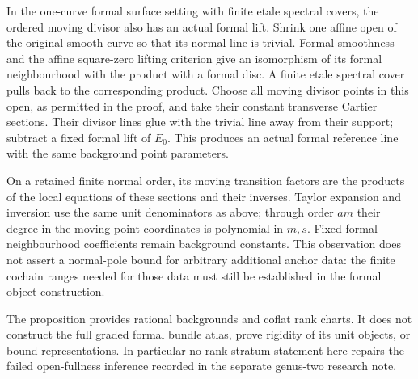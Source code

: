\begin{remark}
In the one-curve formal surface setting with finite etale
spectral covers, the ordered moving divisor also has an actual
formal lift. Shrink one affine open of the original smooth
curve so that its normal line is trivial. Formal smoothness
and the affine square-zero lifting criterion give an
isomorphism of its formal neighbourhood with the product
with a formal disc. A finite etale spectral cover pulls back
to the corresponding product. Choose all moving divisor
points in this open, as permitted in the proof, and take their
constant transverse Cartier sections. Their divisor lines
glue with the trivial line away from their support; subtract
a fixed formal lift of $E_0$. This produces an actual formal
reference line with the same background point parameters.

On a retained finite normal order, its moving transition
factors are the products of the local equations of these
sections and their inverses. Taylor expansion and inversion
use the same unit denominators as above; through order $am$
their degree in the moving point coordinates is polynomial
in $m,s$. Fixed formal-neighbourhood coefficients remain
background constants. This observation does not assert a
normal-pole bound for arbitrary additional anchor data:
the finite cochain ranges needed for those data must still
be established in the formal object construction.

The proposition provides rational backgrounds and coflat
rank charts. It does not construct the full graded formal
bundle atlas, prove rigidity of its unit objects, or bound
representations. In particular no rank-stratum statement
here repairs the failed open-fullness inference recorded
in the separate genus-two research note.
\end{remark}
